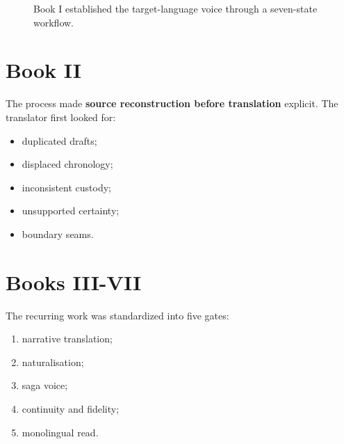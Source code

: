 \documentclass[11pt,oneside,openany]{book}
\providecommand{\tightlist}{%
  \setlength{\itemsep}{0pt}\setlength{\parskip}{0pt}}
\begin{document}
\begin{figure}[htbp]
\centering
{}
\caption{Book I established the target-language voice through a seven-state workflow.}
\end{figure}

\section{Book II}\label{book-ii}

The process made \textbf{source reconstruction before translation} explicit. The translator first looked for:

\begin{itemize}
\tightlist
\item
  duplicated drafts;
\item
  displaced chronology;
\item
  inconsistent custody;
\item
  unsupported certainty;
\item
  boundary seams.
\end{itemize}

\section{Books III-VII}\label{books-iii-vii}

The recurring work was standardized into five gates:

\begin{enumerate}
\def\labelenumi{\arabic{enumi}.}
\tightlist
\item
  narrative translation;
\item
  naturalisation;
\item
  saga voice;
\item
  continuity and fidelity;
\item
  monolingual read.
\end{enumerate}
\end{document}
